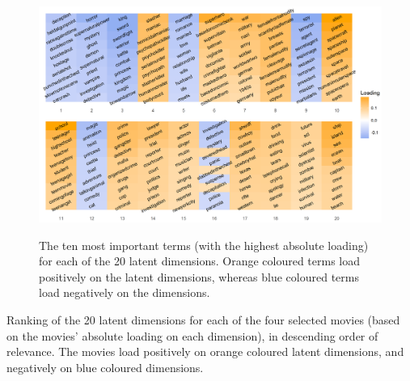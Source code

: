 \documentclass[11pt,a4paper]{article}
\begin{document}
\cleardoublepage
{}
\begin{landscape}
\begin{figure}
\captionsetup{justification=centering}
\caption{The ten most important terms (with the highest absolute loading) for each of the 20 latent dimensions. Orange coloured terms load positively on the latent dimensions, whereas blue coloured terms load negatively on the dimensions.}
\centering
\includegraphics[width=1.45\textwidth]{latent_dims.png}
\label{fig:latentdims}
\end{figure}
\end{landscape}
\restoregeometry
\cleardoublepage
{}
\setcounter{page}{\thesavepage}



\begin{table}[H]
\captionsetup{justification=centering}
\caption {Ranking of the 20 latent dimensions for each of the four selected movies (based on the movies' absolute loading on each dimension), in descending order of relevance. The movies load positively on orange coloured latent dimensions, and negatively on blue coloured dimensions.} \label{tab:movies_desc} 

\end{table}
\end{document}
